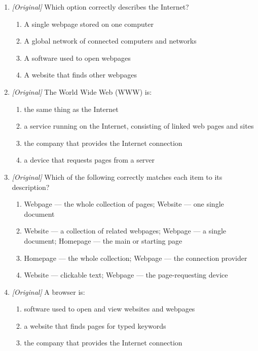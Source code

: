 \begin{enumerate}[label=\textbf{Q\arabic*.}, leftmargin=*]
\item \textit{[Original]} Which option correctly describes the Internet?
  \begin{enumerate}[label=\Alph*.]
    \item A single webpage stored on one computer
    \item A global network of connected computers and networks
    \item A software used to open webpages
    \item A website that finds other webpages
  \end{enumerate}
\item \textit{[Original]} The World Wide Web (WWW) is:
  \begin{enumerate}[label=\Alph*.]
    \item the same thing as the Internet
    \item a service running on the Internet, consisting of linked web pages
      and sites
    \item the company that provides the Internet connection
    \item a device that requests pages from a server
  \end{enumerate}
\item \textit{[Original]} Which of the following correctly matches each item
  to its description?
  \begin{enumerate}[label=\Alph*.]
    \item Webpage --- the whole collection of pages; Website --- one single
      document
    \item Website --- a collection of related webpages; Webpage --- a single
      document; Homepage --- the main or starting page
    \item Homepage --- the whole collection; Webpage --- the connection
      provider
    \item Website --- clickable text; Webpage --- the page-requesting device
  \end{enumerate}
\item \textit{[Original]} A browser is:
  \begin{enumerate}[label=\Alph*.]
    \item software used to open and view websites and webpages
    \item a website that finds pages for typed keywords
    \item the company that provides the Internet connection

\end{enumerate}
\end{enumerate}
